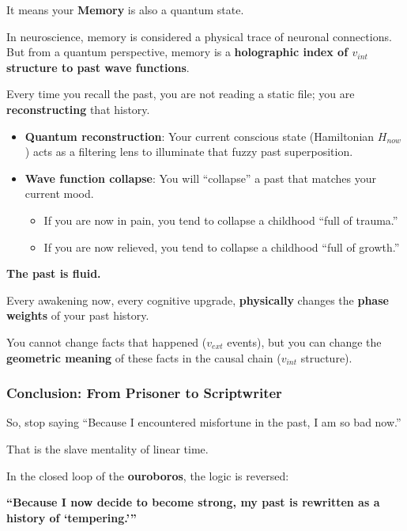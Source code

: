 It means your \textbf{Memory} is also a quantum state.

In neuroscience, memory is considered a physical trace of neuronal connections. But from a quantum perspective, memory is a \textbf{holographic index of $v_{int}$ structure to past wave functions}.

Every time you recall the past, you are not reading a static file; you are \textbf{reconstructing} that history.

\begin{itemize}
\item \textbf{Quantum reconstruction}: Your current conscious state (Hamiltonian $H_{now}$) acts as a filtering lens to illuminate that fuzzy past superposition.

\item \textbf{Wave function collapse}: You will ``collapse'' a past that matches your current mood.

\begin{itemize}
\item If you are now in pain, you tend to collapse a childhood ``full of trauma.''

\item If you are now relieved, you tend to collapse a childhood ``full of growth.''
\end{itemize}
\end{itemize}

\textbf{The past is fluid.}

Every awakening now, every cognitive upgrade, \textbf{physically} changes the \textbf{phase weights} of your past history.

You cannot change facts that happened ($v_{ext}$ events), but you can change the \textbf{geometric meaning} of these facts in the causal chain ($v_{int}$ structure).

\subsubsection{Conclusion: From Prisoner to Scriptwriter}

So, stop saying ``Because I encountered misfortune in the past, I am so bad now.''

That is the slave mentality of linear time.

In the closed loop of the \textbf{ouroboros}, the logic is reversed:

\textbf{``Because I now decide to become strong, my past is rewritten as a history of `tempering.'''}

